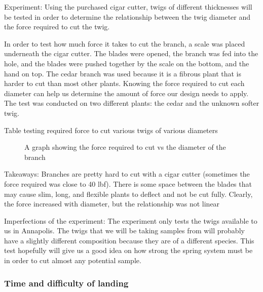 \documentclass{wrcecapstone}
\begin{document}
Experiment: Using the purchased cigar cutter, twigs of different thicknesses will be tested in order to determine the relationship between the twig diameter and the force required to cut the twig.

In order to test how much force it takes to cut the branch, a scale was placed underneath the cigar cutter.  The blades were opened, the branch was fed into the hole, and the blades were pushed together by the scale on the bottom, and the hand on top.  The cedar branch was used because it is a fibrous plant that is harder to cut than most other plants.  Knowing the force required to cut each diameter can help us determine the amount of force our design needs to apply.  The test was conducted on two different plants: the cedar and the unknown softer twig.
\begin{table}
\caption{Table testing required force to cut various twigs of various diameters}
\end{table}
%
%


\begin{figure}
\caption{A graph showing the force required to cut vs the diameter of the branch}
\end{figure}

Takeaways:
Branches are pretty hard to cut with a cigar cutter (sometimes the force required was close to 40 lbf). There is some space between the blades that may cause slim, long, and flexible plants to deflect and not be cut fully. Clearly, the force increased with diameter, but the relationship was not linear

Imperfections of the experiment: The experiment only tests the twigs available to us in Annapolis.  The twigs that we will be taking samples from will probably have a slightly different composition because they are of a different species.  This test hopefully will give us a good idea on how strong the spring system must be in order to cut almost any potential sample.



\subsubsection{Time and difficulty of landing}
  
\end{document}
